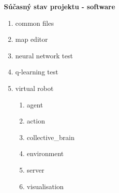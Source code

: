 \documentclass[xcolor=dvipsnames]{beamer}
\begin{document}
\begin{frame}{\bf Súčasný stav projektu - software}

\begin{enumerate}
    \item common files
    \item map editor
    \item neural network test
    \item q-learning test
    \item virtual robot
        \begin{enumerate}
            \item agent
            \item action
            \item collective\_brain
            \item environment
            \item server
            \item visualisation
        \end{enumerate}
\end{enumerate}

\end{frame}
\end{document}
